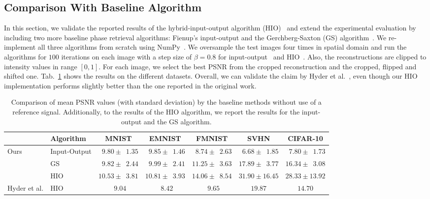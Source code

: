 \subsection{Comparison With Baseline Algorithm}

In this section, we validate the reported results of the hybrid-input-output algorithm (HIO)~\cite{Fienup:82} and extend the experimental evaluation by including two more baseline phase retrieval algorithms: Fienup's input-output and the Gerchberg-Saxton (GS) algorithm~\cite{Gerchberg1972APA}. We re-implement all three algorithms from scratch using NumPy~\cite{numpy}. We oversample the test images four times in spatial domain and run the algorithms for $100$ iterations on each image with a step size of $\beta=0.8$ for input-output~\cite{Fienup:82} and HIO~\cite{Fienup:82}. Also, the reconstructions are clipped to intensity values in range $[0, 1]$. For each image, we select the best PSNR from the cropped reconstruction and the cropped, flipped and shifted one. Tab.~\ref{results:baseline} shows the results on the different datasets. Overall, we can validate the claim by Hyder et al.~\cite{hyder2020solving}, even though our HIO~\cite{Fienup:82} implementation performs slightly better than the one reported in the original work.
\begin{landscape}
\begin{table}
	\centering\small
	\begin{tabular}{llccccc}
		\toprule
		& Algorithm & MNIST& EMNIST& FMNIST & SVHN & CIFAR-10 \\
		\midrule

		\multirow{3}{*}{Ours} & Input-Output & $ \phantom{0}9.80\pm \phantom{0}1.35$ & $ \phantom{0}9.85\pm \phantom{0}1.46$ & $\phantom{0}8.74 \pm  \phantom{0}2.63$ & $\phantom{0}6.68 \pm \phantom{0}1.85$ & $\phantom{0}7.80 \pm \phantom{0}1.73$ \\

		& GS & $\phantom{0}9.82\pm \phantom{0}2.44$ & $ \phantom{0}9.99\pm \phantom{0}2.41$ & $11.25 \pm  \phantom{0}3.63$ & $17.89 \pm \phantom{0}3.77$ & $ 16.34\pm \phantom{0}3.08$ \\

		& HIO  & $10.53\pm \phantom{0}3.81 $& $10.81\pm \phantom{0}3.93$ & $14.06 \pm \phantom{0}8.54$ &  $31.90 \pm 16.45$ & $28.33 \pm 13.92$ \\
		\midrule
		\multirow{1}{*}{Hyder et al. \cite{hyder2020solving}} & HIO & $\phantom{0}9.04$ & $\phantom{0}8.42 $ & $\phantom{0}9.65$ & $19.87$ & $14.70$ \\
		\bottomrule
	\end{tabular}
	\caption{Comparison of mean PSNR values (with standard deviation) by the baseline methods without use of a reference signal. Additionally, to the results of the HIO algorithm, we report the results for the input-output and the GS algorithm.}
	\label{results:baseline}
\end{table}
\end{landscape}

